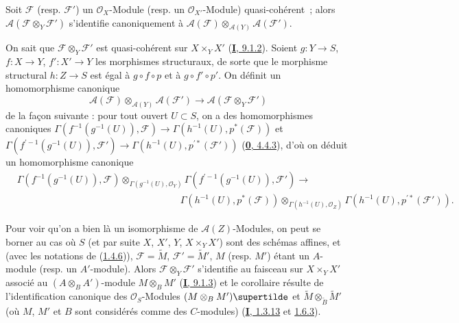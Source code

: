 \begin{corollary}[1.4.7]
\label{II.1.4.7-fr}
Soit $\mathcal{F}$ \textup{(resp. $\mathcal{F}'$)} un $\mathcal{O}_X$-Module \textup{(resp.} un
$\mathcal{O}_{X'}$-Module) quasi-cohérent~; alors
$\mathcal{A}(\mathcal{F}\otimes_Y\mathcal{F}')$ s'identifie canoniquement à
$\mathcal{A}(\mathcal{F})\otimes_{\mathcal{A}(Y)}
\mathcal{A}(\mathcal{F}')$.
\end{corollary}

On sait que $\mathcal{F}\otimes_Y\mathcal{F}'$ est quasi-cohérent sur
$X\times_Y X'$ (\hyperref[I.9.1.2-fr]{\textbf{I}, 9.1.2}). Soient $g:Y\to S$,
$f:X\to Y$, $f':X'\to Y$ les morphismes structuraux, de sorte que le
morphisme structural
$h:Z\to S$ est égal à $g\circ f\circ p$ et à $g\circ f'\circ p'$. On
définit un homomorphisme canonique
\[
  \mathcal{A}(\mathcal{F})\otimes_{\mathcal{A}(Y)}\mathcal{A}(\mathcal{F}')
  \longrightarrow \mathcal{A}(\mathcal{F}\otimes_Y\mathcal{F}')
\]
de la façon suivante : pour tout ouvert $U\subset S$, on a des homomorphismes
canoniques
$\Gamma(f^{-1}(g^{-1}(U)),\mathcal{F})\to\Gamma(h^{-1}(U),p^*(\mathcal{F}))$ et
$\Gamma(f^{\prime-1}(g^{-1}(U)),\mathcal{F}')\to\Gamma(h^{-1}(U),p^{\prime*}(\mathcal{F}'))$
(\hyperref[0.4.4.3-fr]{\textbf{0}, 4.4.3}), d'où on déduit un homomorphisme canonique
\[
  \begin{aligned}
  &\Gamma(f^{-1}(g^{-1}(U)),\mathcal{F})
    \otimes_{\Gamma(g^{-1}(U),\mathcal{O}_Y)}
    \Gamma(f^{\prime-1}(g^{-1}(U)),\mathcal{F}')\longrightarrow\\
  &\hspace{17em}
    \Gamma(h^{-1}(U),p^*(\mathcal{F}))
    \otimes_{\Gamma(h^{-1}(U),\mathcal{O}_Z)}
    \Gamma(h^{-1}(U),p^{\prime*}(\mathcal{F}')).
  \end{aligned}
\]

Pour voir qu'on a bien là un isomorphisme de $\mathcal{A}(Z)$-Modules, on
peut se borner au cas où $S$ (et par suite $X$, $X'$, $Y$,
$X\times_Y X'$) sont des schémas affines, et (avec les notations de
(\hyperref[II.1.4.6-fr]{1.4.6})), $\mathcal{F}=\widetilde{M}$,
$\mathcal{F}'=\widetilde{M}'$, $M$ (resp. $M'$) étant un $A$-module (resp. un
$A'$-module). Alors $\mathcal{F}\otimes_Y\mathcal{F}'$ s'identifie au
faisceau sur $X\times_Y X'$ associé au $(A\otimes_B A')$-module
$M\otimes_B M'$ (\hyperref[I.9.1.3-fr]{\textbf{I}, 9.1.3}) et le corollaire résulte de
l'identification canonique des $\mathcal{O}_S$-Modules
$(M\otimes_B M')\supertilde$ et
$\widetilde{M}\otimes_{\widetilde{B}}\widetilde{M}'$ (où $M$, $M'$ et $B$
sont considérés comme des $C$-modules)
(\hyperref[I.1.3.13-fr]{\textbf{I}, 1.3.13} et
\hyperref[I.1.6.3-fr]{1.6.3}).

